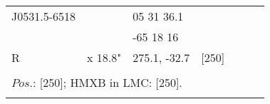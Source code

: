 \documentclass{aa}
\begin{document}
\begin{table*}[h]
\begin{tabular}{p{2.5cm}p{1cm}p{1.8cm}p{2.3cm}p{3.3cm}p{2.0cm}p{2.2cm}}
\noalign{\smallskip}
\hline
\noalign{\smallskip}
J0531.5-6518   &                 &   05 31 36.1 &                  &       &      &     \\
                            &                 & -65 18 16     &                  &       &      &        \\                                       
     R                    &  x 18.8"  & 275.1, -32.7  &   [250]      &       &      &     \\
\\
\multicolumn{7}{p{17.5cm}}{
$Pos$.: [250]; HMXB in LMC: [250].                 }\\

\noalign{\smallskip}
\hline
\end{tabular}
\end{table*}
\end{document}
